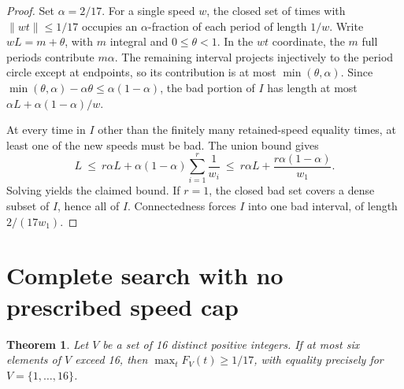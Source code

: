 \documentclass[10pt]{article}
\newtheorem{theorem}{Theorem}
\begin{document}
\begin{proof}
Set \(\alpha=2/17\). For a single speed \(w\), the closed set of
times with \(\|wt\|\leq1/17\) occupies an \(\alpha\)-fraction
of each period of length \(1/w\). Write \(wL=m+\theta\), with
\(m\) integral and \(0\leq\theta<1\). In the \(wt\) coordinate,
the \(m\) full periods contribute \(m\alpha\). The remaining
interval projects injectively to the period circle except at
endpoints, so its contribution is at most \(\min(\theta,\alpha)\).
Since \(\min(\theta,\alpha)-\alpha\theta\leq\alpha(1-\alpha)\),
the bad portion of \(I\) has length at most
\(\alpha L+\alpha(1-\alpha)/w\).

At every time in \(I\) other than the finitely many retained-speed
equality times, at least one of the new speeds must be bad.
The union bound gives
\[
 L\ \leq\ r\alpha L+\alpha(1-\alpha)\sum_{i=1}^r\frac1{w_i}
 \ \leq\ r\alpha L+\frac{r\alpha(1-\alpha)}{w_1}.
\]
Solving yields the claimed bound. If \(r=1\), the closed bad
set covers a dense subset of \(I\), hence all of \(I\).
Connectedness forces \(I\) into one bad interval, of length
\(2/(17w_1)\).
\end{proof}

\section{Complete search with no prescribed speed cap}
\begin{theorem}
Let \(V\) be a set of 16 distinct positive integers. If at most
six elements of \(V\) exceed 16, then
\(\max_t F_V(t)\geq1/17\), with equality precisely for
\(V=\{1,\ldots,16\}\).
\end{theorem}
\end{document}
